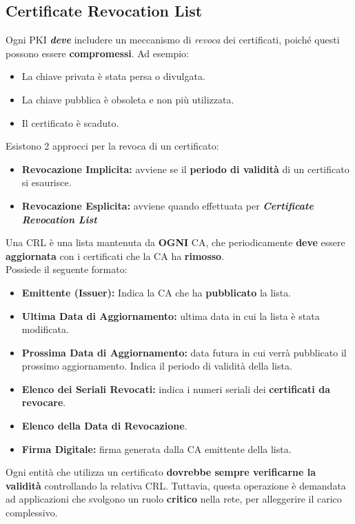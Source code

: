 \subsection{Certificate Revocation List}
Ogni PKI \textit{\textbf{deve}} includere un meccanismo di \textit{revoca} dei certificati, poiché questi possono essere \textbf{compromessi}. Ad esempio: 
\begin{itemize}
    \item La chiave privata è stata persa o divulgata.
    \item La chiave pubblica è obsoleta e non più utilizzata.
    \item Il certificato è scaduto.
\end{itemize}
Esistono 2 approcci per la revoca di un certificato:
\begin{itemize}
    \item \textbf{Revocazione Implicita:} avviene se il \textbf{periodo di validità} di un certificato si esaurisce.
    \item \textbf{Revocazione Esplicita:} avviene quando effettuata per \textbf{\textit{Certificate Revocation List}}
\end{itemize}
\begin{definition}
Una CRL è una lista mantenuta da \textbf{OGNI} CA, che periodicamente \textbf{deve} essere \textbf{aggiornata} con i certificati che la CA ha \textbf{rimosso}.\\
Possiede il seguente formato:
\begin{itemize}
    \item \textbf{Emittente (Issuer):} Indica la CA che ha \textbf{pubblicato} la lista.
    \item \textbf{Ultima Data di Aggiornamento:} ultima data in cui la lista è stata modificata.
    \item \textbf{Prossima Data di Aggiornamento:} data futura in cui verrà pubblicato il prossimo aggiornamento. Indica il periodo di validità della lista.
    \item \textbf{Elenco dei Seriali Revocati:} indica i numeri seriali dei \textbf{certificati da revocare}.
    \item \textbf{Elenco della Data di Revocazione}.
    \item \textbf{Firma Digitale:} firma generata dalla CA emittente della lista.
\end{itemize}
\end{definition}
\begin{note}
Ogni entità che utilizza un certificato \textbf{dovrebbe sempre verificarne la validità} controllando la relativa CRL. Tuttavia, questa operazione è demandata ad applicazioni che svolgono un ruolo \textbf{critico} nella rete, per alleggerire il carico complessivo.
\end{note}
